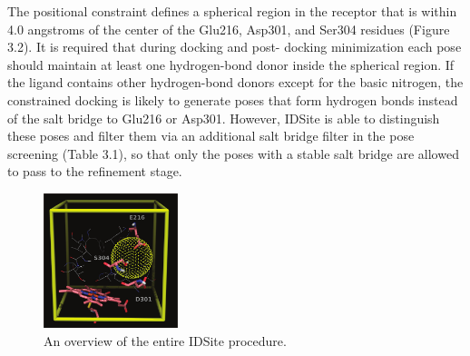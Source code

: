 The positional constraint defines a spherical region in the receptor that is within 4.0 angstroms of the center of the Glu216, Asp301, and Ser304 residues (Figure 3.2).
It is required that during docking and post- docking minimization each pose should maintain at least one hydrogen-bond donor inside the spherical region.
If the ligand contains other hydrogen-bond donors except for the basic nitrogen, the constrained docking is likely to generate poses that form hydrogen bonds instead of the salt bridge to Glu216 or Asp301.
However, IDSite is able to distinguish these poses and filter them via an additional salt bridge filter in the pose screening (Table 3.1), so that only the poses with a stable salt bridge are allowed to pass to the refinement stage.

\begin{figure}[h]
\centering
\includegraphics[width=0.35\textwidth]{figures/idsite/glide.png}
\caption{An overview of the entire IDSite procedure.}
\label{fig:idsite_glide}
\end{figure}
